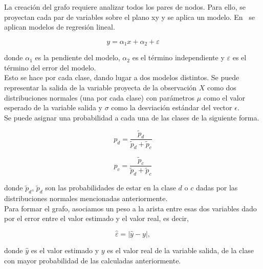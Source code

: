 La creación del grafo requiere analizar todos los pares de nodos. Para ello, se proyectan cada par de variables sobre el plano xy y se aplica un modelo. En~\cite{metabo3010155, 1304.1896, Zanin2014} se aplican modelos de regresión lineal.

\begin{equation}
y = \alpha_1 x + \alpha_2 + \varepsilon
\end{equation} 

donde $\alpha_1$ es la pendiente del modelo, $\alpha_2$ es el término independiente y $\varepsilon$ es el término del error del modelo.\\

Esto se hace por cada clase, dando lugar a dos modelos distintos. Se puede representar la salida de la variable proyecta de la observación $X$ como dos distribuciones normales (una por cada clase) con parámetros $\mu$ como el valor esperado de la variable salida y $\sigma$ como la desviación estándar del vector $\epsilon$.\\

Se puede asignar una probabilidad a cada una de las clases de la siguiente forma.

\begin{equation}\label{eq:prob1}
p_d = \dfrac{\tilde{p}_d}{\tilde{p}_d + \tilde{p}_c}
\end{equation}

\begin{equation}\label{eq:prob2}
p_c = \dfrac{\tilde{p}_c}{\tilde{p}_d + \tilde{p}_c}
\end{equation}

donde $\tilde{p}_d$, $\tilde{p}_d$ son las probabilidades de estar en la clase $d$ o $c$ dadas por las distribuciones normales mencionadas anteriormente.\\

Para formar el grafo, asociamos un peso a la arista entre esas dos variables dado por el error entre el valor estimado y el valor real, es decir,

\begin{equation}
\hat{\varepsilon} = |\hat{y} - y|,
\end{equation} 

donde $\hat{y}$ es el valor estimado y $y$ es el valor real de la variable salida, de la clase con mayor probabilidad de las calculadas anteriormente.\\

